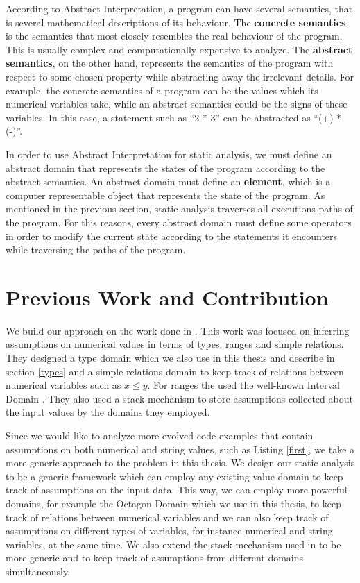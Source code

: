 \documentclass[10pt]{report}
\begin{document}
According to Abstract Interpretation, a program can have several semantics, that is several mathematical descriptions of its behaviour. The \textbf{concrete semantics} is the semantics that most closely resembles the real behaviour of the program. This is usually complex and computationally expensive to analyze. The \textbf{abstract semantics}, on the other hand, represents the semantics of the program with respect to some chosen property while abstracting away the irrelevant details. For example, the concrete semantics of a program can be the values which its numerical variables take, while an abstract semantics could be the signs of these variables. In this case, a statement such as ``2 * 3'' can be abstracted as ``(+) * (-)''. 

In order to use Abstract Interpretation for static analysis, we must define an abstract domain that represents the states of the program according to the abstract semantics. An abstract domain must define an \textbf{element}, which is a computer representable object that represents the state of the program. As mentioned in the previous section, static analysis traverses all executions paths of the program. For this reasons, every abstract domain must define some operators in order to modify the current state according to the statements it encounters while traversing the paths of the program.  


\section{Previous Work and Contribution}

We build our approach on the work done in \cite{madelin}. This work was focused on inferring assumptions on numerical values in terms of types, ranges and simple relations. They designed a type domain which we also use in this thesis and describe in section \ref{types} and a simple relations domain to keep track of relations between numerical variables such as $ x \leq y $. For ranges the used the well-known Interval Domain \cite{cousot}. They also used a stack mechanism to store assumptions collected about the input values by the domains they employed. 

Since we would like to analyze more evolved code examples that contain assumptions on both numerical and string values, such as Listing \ref{first}, we take a more generic approach to the problem in this thesis. We design our static analysis to be a generic framework which can employ any existing value domain to keep track of assumptions on the input data. This way, we can employ more powerful domains, for example the Octagon Domain which we use in this thesis, to keep track of relations between numerical variables and we can also keep track of assumptions on different types of variables, for instance numerical and string variables, at the same time. We also extend the stack mechanism used in \cite{madelin} to be more generic and to keep track of assumptions from different domains simultaneously.  
\end{document}
